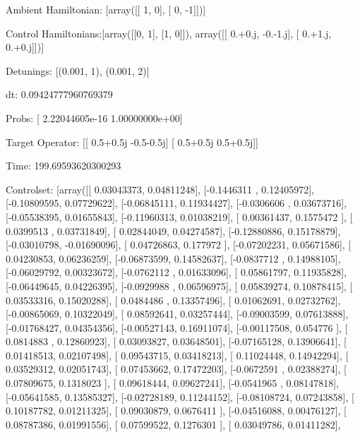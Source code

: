\documentclass{article}
\begin{document}
    

\newpage

Ambient Hamiltonian: [array([[ 1,  0],
       [ 0, -1]])]

Control Hamiltonians:[array([[0, 1],
       [1, 0]]), array([[ 0.+0.j, -0.-1.j],
       [ 0.+1.j,  0.+0.j]])]

Detunings: [(0.001, 1), (0.001, 2)]

 dt: 0.09424777960769379

Probs: [  2.22044605e-16   1.00000000e+00]

Target Operator: [[ 0.5+0.5j -0.5-0.5j]
 [ 0.5+0.5j  0.5+0.5j]]

Time: 199.69593620300293

Controlset: [array([[ 0.03043373,  0.04811248],
       [-0.1446311 ,  0.12405972],
       [-0.10809595,  0.07729622],
       [-0.06845111,  0.11934427],
       [-0.0306606 ,  0.03673716],
       [-0.05538395,  0.01655843],
       [-0.11960313,  0.01038219],
       [ 0.00361437,  0.1575472 ],
       [ 0.0399513 ,  0.03731849],
       [ 0.02844049,  0.04274587],
       [-0.12880886,  0.15178879],
       [-0.03010798, -0.01690096],
       [ 0.04726863,  0.177972  ],
       [-0.07202231,  0.05671586],
       [ 0.04230853,  0.06236259],
       [-0.06873599,  0.14582637],
       [-0.0837712 ,  0.14988105],
       [-0.06029792,  0.00323672],
       [-0.0762112 ,  0.01633096],
       [ 0.05861797,  0.11935828],
       [-0.06449645,  0.04226395],
       [-0.0929988 ,  0.06596975],
       [ 0.05839274,  0.10878415],
       [ 0.03533316,  0.15020288],
       [ 0.0484486 ,  0.13357496],
       [ 0.01062691,  0.02732762],
       [-0.00865069,  0.10322049],
       [ 0.08592641,  0.03257444],
       [-0.09003599,  0.07613888],
       [-0.01768427,  0.04354356],
       [-0.00527143,  0.16911074],
       [-0.00117508,  0.054776  ],
       [ 0.0814883 ,  0.12860923],
       [ 0.03093827,  0.03648501],
       [-0.07165128,  0.13906641],
       [ 0.01418513,  0.02107498],
       [ 0.09543715,  0.03418213],
       [ 0.11024448,  0.14942294],
       [ 0.03529312,  0.02051743],
       [ 0.07453662,  0.17472203],
       [-0.0672591 ,  0.02388274],
       [ 0.07809675,  0.1318023 ],
       [ 0.09618444,  0.09627241],
       [-0.0541965 ,  0.08147818],
       [-0.05641585,  0.13585327],
       [-0.02728189,  0.11244152],
       [-0.08108724,  0.07243858],
       [ 0.10187782,  0.01211325],
       [ 0.09030879,  0.0676411 ],
       [-0.04516088,  0.00476127],
       [ 0.08787386,  0.01991556],
       [ 0.07599522,  0.1276301 ],
       [ 0.03049786,  0.01411282],
\end{document}

